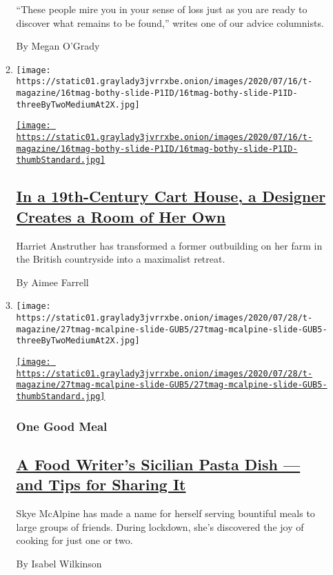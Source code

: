 \begin{enumerate}
\begin{enumerate}
    ``These people mire you in your sense of loss just as you are ready
    to discover what remains to be found,'' writes one of our advice
    columnists.

    By Megan O'Grady
  \item
    \texttt{[image: https://static01.graylady3jvrrxbe.onion/images/2020/07/16/t-magazine/16tmag-bothy-slide-P1ID/16tmag-bothy-slide-P1ID-threeByTwoMediumAt2X.jpg]}

    \href{/2020/07/31/t-magazine/design-bothy-anstruther.html}{\texttt{[image: https://static01.graylady3jvrrxbe.onion/images/2020/07/16/t-magazine/16tmag-bothy-slide-P1ID/16tmag-bothy-slide-P1ID-thumbStandard.jpg]}}

    \hypertarget{in-a-19th-century-cart-house-a-designer-creates-a-room-of-her-own}{%
    \subsection{\texorpdfstring{\href{/2020/07/31/t-magazine/design-bothy-anstruther.html}{In
    a 19th-Century Cart House, a Designer Creates a Room of Her
    Own}}{In a 19th-Century Cart House, a Designer Creates a Room of Her Own}}\label{in-a-19th-century-cart-house-a-designer-creates-a-room-of-her-own}}

    Harriet Anstruther has transformed a former outbuilding on her farm
    in the British countryside into a maximalist retreat.

    By Aimee Farrell
  \item
    \texttt{[image: https://static01.graylady3jvrrxbe.onion/images/2020/07/28/t-magazine/27tmag-mcalpine-slide-GUB5/27tmag-mcalpine-slide-GUB5-threeByTwoMediumAt2X.jpg]}

    \href{/2020/07/29/t-magazine/skye-mcalpine-pasta-cooking.html}{\texttt{[image: https://static01.graylady3jvrrxbe.onion/images/2020/07/28/t-magazine/27tmag-mcalpine-slide-GUB5/27tmag-mcalpine-slide-GUB5-thumbStandard.jpg]}}

    \hypertarget{one-good-meal}{%
    \subsubsection{One Good Meal}\label{one-good-meal}}

    \hypertarget{a-food-writers-sicilian-pasta-dish--and-tips-for-sharing-it}{%
    \subsection{\texorpdfstring{\href{/2020/07/29/t-magazine/skye-mcalpine-pasta-cooking.html}{A
    Food Writer's Sicilian Pasta Dish --- and Tips for Sharing
    It}}{A Food Writer's Sicilian Pasta Dish --- and Tips for Sharing It}}\label{a-food-writers-sicilian-pasta-dish--and-tips-for-sharing-it}}

    Skye McAlpine has made a name for herself serving bountiful meals to
    large groups of friends. During lockdown, she's discovered the joy
    of cooking for just one or two.

    By Isabel Wilkinson
  \end{enumerate}
\end{enumerate}

